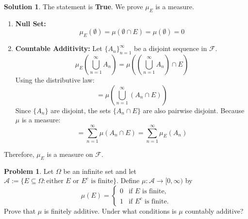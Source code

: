 \documentclass{article}
\theoremstyle{definition}
\newtheorem{problem}{Problem}
\newtheorem*{solution}{Solution}
\begin{document}
\begin{solution}
The statement is \textbf{True}. We prove $\mu_E$ is a measure.

\begin{enumerate}
    \item \textbf{Null Set:}
    \[ \mu_E(\emptyset) = \mu(\emptyset \cap E) = \mu(\emptyset) = 0 \]
    
    \item \textbf{Countable Additivity:}
    Let $\{A_n\}_{n=1}^\infty$ be a disjoint sequence in $\mathcal{F}$.
    \[ \mu_E\left(\bigcup_{n=1}^\infty A_n\right) = \mu\left( \left(\bigcup_{n=1}^\infty A_n\right) \cap E \right) \]
    Using the distributive law:
    \[ = \mu\left( \bigcup_{n=1}^\infty (A_n \cap E) \right) \]
    Since $\{A_n\}$ are disjoint, the sets $\{A_n \cap E\}$ are also pairwise disjoint. Because $\mu$ is a measure:
    \[ = \sum_{n=1}^\infty \mu(A_n \cap E) = \sum_{n=1}^\infty \mu_E(A_n) \]
\end{enumerate}
Therefore, $\mu_E$ is a measure on $\mathcal{F}$.
\end{solution}

\hrulefill

\begin{problem}
Let $\Omega$ be an infinite set and let $\mathcal{A} := \{ E \subseteq \Omega : \text{either } E \text{ or } E^c \text{ is finite}\}$. Define $\mu: \mathcal{A} \to [0, \infty)$ by
\[ \mu(E) = \begin{cases} 0 & \text{if } E \text{ is finite,} \\ 1 & \text{if } E^c \text{ is finite.} \end{cases} \]
Prove that $\mu$ is finitely additive. Under what conditions is $\mu$ countably additive?
\end{problem}
\end{document}
